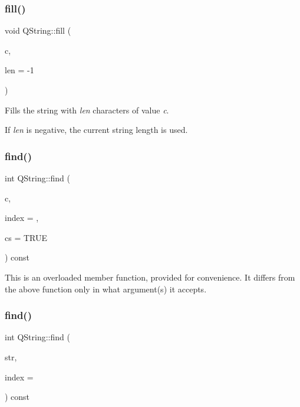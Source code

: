 \subsubsection{\texorpdfstring{fill()}{fill()}}
{\footnotesize\ttfamily void Q\+String\+::fill (\begin{DoxyParamCaption}\item[{\mbox{\hyperlink{class_q_char}{Q\+Char}}}]{c,  }\item[{int}]{len = {\ttfamily -\/1} }\end{DoxyParamCaption})}

Fills the string with {\itshape len} characters of value {\itshape c}.

If {\itshape len} is negative, the current string length is used. \mbox{\label{class_q_string_a5c6efe54d7b27611879cfbac15ee4736}} 
\subsubsection{\texorpdfstring{find()}{find()}\hspace{0.1cm}{\footnotesize\ttfamily [1/5]}}
{\footnotesize\ttfamily int Q\+String\+::find (\begin{DoxyParamCaption}\item[{char}]{c,  }\item[{int}]{index = {},  }\item[{bool}]{cs = {\ttfamily TRUE} }\end{DoxyParamCaption}) const\hspace{0.3cm}{\ttfamily [inline]}}

This is an overloaded member function, provided for convenience. It differs from the above function only in what argument(s) it accepts. \mbox{\label{class_q_string_a78f93a65d91bb0fd659ff9af5b82f956}} 
\subsubsection{\texorpdfstring{find()}{find()}\hspace{0.1cm}{\footnotesize\ttfamily [2/5]}}
{\footnotesize\ttfamily int Q\+String\+::find (\begin{DoxyParamCaption}\item[{const char $\ast$}]{str,  }\item[{int}]{index = {} }\end{DoxyParamCaption}) const\hspace{0.3cm}{\ttfamily [inline]}}

